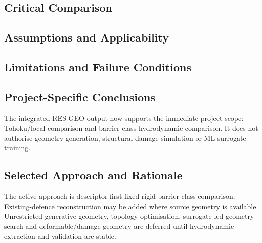 
\subsection{Critical Comparison}
\label{sec:res-geo-spec-critical-comparison}


\subsection{Assumptions and Applicability}
\label{sec:res-geo-spec-assumptions}


\subsection{Limitations and Failure Conditions}
\label{sec:res-geo-spec-limitations}


\subsection{Project-Specific Conclusions}
\label{sec:res-geo-spec-conclusions}

The integrated RES-GEO output now supports the immediate project
scope: Tohoku/local comparison and barrier-class hydrodynamic
comparison. It does not authorise geometry generation, structural
damage simulation or ML surrogate training.

\subsection{Selected Approach and Rationale}
\label{sec:res-geo-spec-selected-approach}

The active approach is descriptor-first fixed-rigid barrier-class
comparison. Existing-defence reconstruction may be added where source
geometry is available. Unrestricted generative geometry, topology
optimisation, surrogate-led geometry search and deformable/damage
geometry are deferred until hydrodynamic extraction and validation
are stable.

